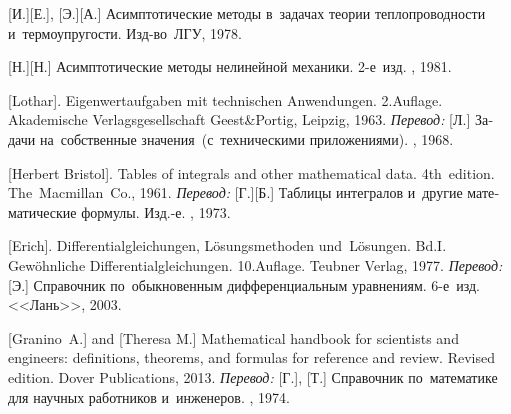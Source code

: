 \begin{thebibliography}{123}
\begin{otherlanguage}{russian}
[И.][Е.], %
[Э.][А.] %
Асимптотические методы в~задачах теории теплопроводности и~термоупругости. Изд\hbox{-}во~ЛГУ, 1978. 

[Н.][Н.] Асимптотические методы нелинейной механики. 2\hbox{-}е~изд. \naukapublisher, 1981. 

%
%



[Lothar]. Eigenwertaufgaben mit technischen Anwendungen. 2.\:Auflage. Akademische Verlagsgesellschaft Geest\;\&\;Portig, Leipzig, 1963. 
\emph{Перевод:} [Л.] Задачи на~собственные значения~(с~техническими приложениями). \naukapublisher, 1968. 

[Herbert Bristol]. Tables of integrals and other mathematical data. 4th~edition. The~Macmillan~Co., 1961. 
\emph{Перевод:} [Г.][Б.] Таблицы интегралов и~другие математические формулы. Изд.\hbox{-}е. \naukapublisher, 1973. 

[Erich]. Differentialgleichungen, Lösungsmethoden und~Lö\-sun\-gen. Bd.\:I. Gewöhnliche Differentialgleichungen. 10.\:Auflage. Teubner Verlag, 1977. 
\emph{Перевод:} [Э.] Справочник по~обыкновенным дифференциальным уравнениям. 6\hbox{-}е~изд. <<Лань>>, 2003. 

[Granino~A.] and [Theresa M.]
Mathematical handbook for scientists and engineers: definitions, theorems, and formulas for reference and review.
Revised edition. Dover Publications, 2013. 
\emph{Перевод:} [Г.], [Т.] Справочник по~математике для научных работников и~инженеров. \naukapublisher, 1974. 


\end{otherlanguage}
\end{thebibliography}
